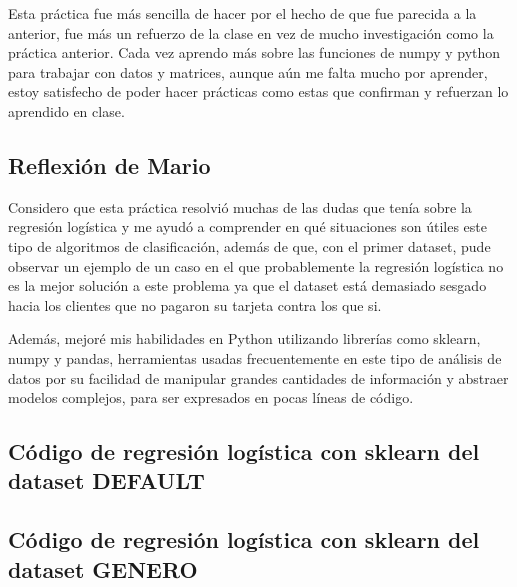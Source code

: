 \documentclass[sigconf,authorversion,nonacm]{acmart}
\begin{document}
Esta práctica fue más sencilla de hacer por el hecho de que fue parecida a la anterior, fue más un refuerzo de la clase en vez de mucho investigación como la práctica anterior. Cada vez aprendo más sobre las funciones de numpy y python para trabajar con datos y matrices, aunque aún me falta mucho por aprender, estoy satisfecho de poder hacer prácticas como estas que confirman y refuerzan lo aprendido en clase.


\subsection{Reflexión de Mario}
Considero que esta práctica resolvió muchas de las dudas que tenía sobre la regresión logística y me ayudó a comprender en qué situaciones son útiles este tipo de algoritmos de clasificación, además de que, con el primer dataset, pude observar un ejemplo de un caso en el que probablemente la regresión logística no es la mejor solución a este problema ya que el dataset está demasiado sesgado hacia los clientes que no pagaron su tarjeta contra los que si.

Además, mejoré mis habilidades en Python utilizando librerías como sklearn, numpy y pandas, herramientas usadas frecuentemente en este tipo de análisis de datos por su facilidad de manipular grandes cantidades de información y abstraer modelos complejos, para ser expresados en pocas líneas de código.





\clearpage

\appendix

\lstset{style=customstyle}

\begin{figure*}
  \section{Código de regresión logística con sklearn del dataset DEFAULT}
  
\end{figure*}

\begin{figure*}
  \section{Código de regresión logística con sklearn del dataset GENERO}
  
\end{figure*}
\end{document}
